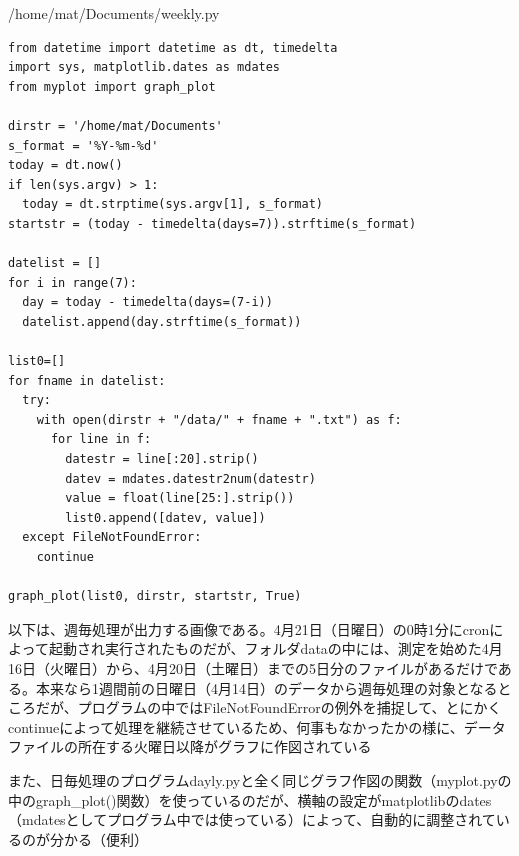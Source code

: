 \documentclass[12pt,a4paper,uplatex]{jsarticle}
\begin{document}
\begin{itembox}[l]{/home/mat/Documents/weekly.py}
	\begin{verbatim}
from datetime import datetime as dt, timedelta
import sys, matplotlib.dates as mdates
from myplot import graph_plot

dirstr = '/home/mat/Documents'
s_format = '%Y-%m-%d'
today = dt.now()
if len(sys.argv) > 1:
  today = dt.strptime(sys.argv[1], s_format)
startstr = (today - timedelta(days=7)).strftime(s_format)

datelist = []
for i in range(7):
  day = today - timedelta(days=(7-i))
  datelist.append(day.strftime(s_format))

list0=[]
for fname in datelist:
  try:
    with open(dirstr + "/data/" + fname + ".txt") as f:
      for line in f:
        datestr = line[:20].strip()
        datev = mdates.datestr2num(datestr)
        value = float(line[25:].strip())
        list0.append([datev, value])
  except FileNotFoundError:
    continue

graph_plot(list0, dirstr, startstr, True)
	\end{verbatim}
\end{itembox}

以下は、週毎処理が出力する画像である。4月21日（日曜日）の0時1分にcronによって起動され実行されたものだが、フォルダdataの中には、測定を始めた4月16日（火曜日）から、4月20日（土曜日）までの5日分のファイルがあるだけである。本来なら1週間前の日曜日（4月14日）のデータから週毎処理の対象となるところだが、プログラムの中ではFileNotFoundErrorの例外を捕捉して、とにかくcontinueによって処理を継続させているため、何事もなかったかの様に、データファイルの所在する火曜日以降がグラフに作図されている

また、日毎処理のプログラムdayly.pyと全く同じグラフ作図の関数（myplot.pyの中のgraph\_plot()関数）を使っているのだが、横軸の設定がmatplotlibのdates（mdatesとしてプログラム中では使っている）によって、自動的に調整されているのが分かる（便利）
\end{document}
